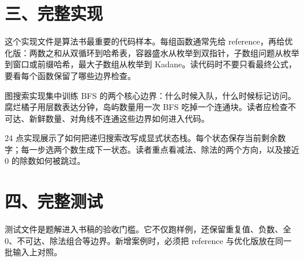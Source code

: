 \section{三、完整实现}

这个实现文件是算法书最重要的代码样本。每组函数通常先给 reference，再给优化版：两数之和从双循环到哈希表，容器盛水从枚举到双指针，子数组问题从枚举到窗口或前缀哈希，最大子数组从枚举到 Kadane。读代码时不要只看最终公式，要看每个函数保留了哪些边界检查。




图搜索实现集中训练 BFS 的两个核心边界：什么时候入队，什么时候标记访问。腐烂橘子用层数表达分钟，岛屿数量用一次 BFS 吃掉一个连通块。读者应检查不可达、新鲜数量、对角线不连通这些边界如何进入代码。




24 点实现展示了如何把递归搜索改写成显式状态栈。每个状态保存当前剩余数字；每一步选两个数生成下一状态。读者重点看减法、除法的两个方向，以及接近 0 的除数如何被跳过。



\section{四、完整测试}

测试文件是题解进入书稿的验收门槛。它不仅跑样例，还保留重复值、负数、全 0、不可达、除法组合等边界。新增案例时，必须把 reference 与优化版放在同一批输入上对照。


